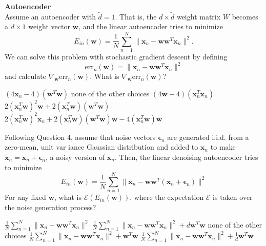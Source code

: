 \documentclass[a4paper,10pt]{exam}
\begin{document}
\begin{questions}
		\question \textbf{Autoencoder}\\
		Assume an autoencoder with $\tilde{d} = 1$. That is, the $d \times \tilde{d}$ weight matrix $W$ becomes a $d \times 1$ weight vector $\mathbf{w}$, and the linear autoencoder tries to minimize 
		\[E_{in}(\mathbf{w}) = \frac{1}{N} \sum_{n=1}^N \|\mathbf{x}_n - \mathbf{w} \mathbf{w}^T \mathbf{x}_n\|^2.\]
		We can solve this problem with stochastic gradient descent by defining
		\[\text{err}_n(\mathbf{w}) = \|\mathbf{x}_n - \mathbf{w} \mathbf{w}^T \mathbf{x}_n\|^2\]
		and calculate $\nabla_\mathbf{w} \text{err}_n(\mathbf{w})$. What is $\nabla_\mathbf{w} \text{err}_n(\mathbf{w})$?
		\begin{choices}
			\choice $(4 \mathbf{x}_n - 4) (\mathbf{w}^T \mathbf{w})$
			\choice none of the other choices
			\choice $(4 \mathbf{w} - 4) (\mathbf{x}_n^T \mathbf{x}_n)$
			\CorrectChoice $2 (\mathbf{x}_n^T \mathbf{w})^2 \mathbf{w} + 2 (\mathbf{x}_n^T \mathbf{w}) (\mathbf{w}^T \mathbf{w})$
			\choice $2 (\mathbf{x}_n^T \mathbf{w})^2 \mathbf{x}_n + 2 (\mathbf{x}_n^T \mathbf{w}) (\mathbf{w}^T \mathbf{w}) \mathbf{w} - 4 (\mathbf{x}_n^T \mathbf{w}) \mathbf{w}$\\
		\end{choices}
		
		\question Following Question 4, assume that noise vectors ${\boldsymbol\epsilon}_n$ are generated i.i.d. from a zero-mean, unit var iance Gaussian distribution and added to $\mathbf{x}_n$ to make $\tilde{\mathbf{x}}_n = \mathbf{x}_n + {\boldsymbol\epsilon}_n$, a noisy version of $\mathbf{x}_n$. Then, the linear denoising autoencoder tries to minimize
		\[E_{in}(\mathbf{w}) = \frac{1}{N} \sum_{n=1}^N \|\mathbf{x}_n - \mathbf{w} \mathbf{w}^T (\mathbf{x}_n + {\boldsymbol\epsilon}_n)\| ^2\]
		For any fixed $\mathbf{w}$, what is $\mathcal{E}\left(E_{in}(\mathbf{w})\right)$, where the expectation $\mathcal{E}$ is taken over the noise generation process?
		\begin{choices}
			\choice $\frac{1}{N} \sum_{n=1}^N \|\mathbf{x}_n - \mathbf{w} \mathbf{w}^T \mathbf{x}_n\|^2$
			\CorrectChoice $\frac{1}{N} \sum_{n=1}^N \|\mathbf{x}_n - \mathbf{w} \mathbf{w}^T \mathbf{x}_n\|^2 + d \mathbf{w}^T \mathbf{w}$
			\choice none of the other choices
			\choice $\frac{1}{N} \sum_{n=1}^N \|\mathbf{x}_n - \mathbf{w} \mathbf{w}^T \mathbf{x}_n\|^2 + \mathbf{w}^T \mathbf{w}$
			\choice $\frac{1}{N} \sum_{n=1}^N \|\mathbf{x}_n - \mathbf{w} \mathbf{w}^T \mathbf{x}_n\|^2 + \frac{1}{d} \mathbf{w}^T \mathbf{w}$\\
		\end{choices}
		

\end{questions}
\end{document}
